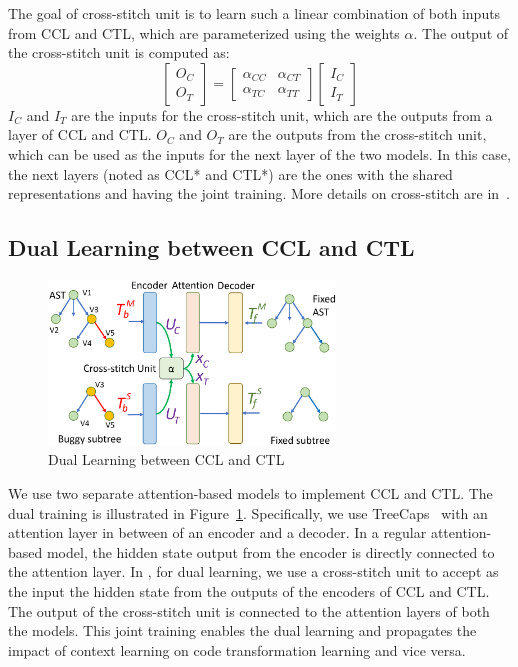 The goal of cross-stitch unit is to learn such a linear combination of
both inputs from CCL and CTL, which are parameterized
using the weights $\alpha$. The output of the cross-stitch unit is
computed as:
\begin{equation}\label{eq:cross-stitch}
	\begin{bmatrix}
		O_C\\
		O_T
	\end{bmatrix}
	=
	\begin{bmatrix}
		\alpha_{CC} &  \alpha_{CT} \\
		\alpha_{TC} &  \alpha_{TT}
	\end{bmatrix}
	\begin{bmatrix}
		I_C\\
		I_T
	\end{bmatrix}
\end{equation}
$I_C$ and $I_T$ are the inputs for the cross-stitch unit, which are
the outputs from a layer of CCL and CTL. $O_C$ and $O_T$ are the
outputs from the cross-stitch unit, which can be used as the inputs
for the next layer of the two models. In this case, the next layers
(noted as CCL* and CTL*) are the ones with the shared representations
and having the joint training. More details on cross-stitch are
in~\cite{misra2016cross}.

\subsection{Dual Learning between CCL and CTL}

\begin{figure}[t]
	\centering
	\includegraphics[width=3in]{graphs/dual-learning-repair.png}
	\caption{Dual Learning between CCL and CTL}
	\label{fig:dual-learning}
\end{figure}

We use two separate attention-based  models to implement
CCL and CTL. The dual training is illustrated in
Figure~\ref{fig:dual-learning}. Specifically, we use
TreeCaps~\cite{bui2021treecaps} with an attention layer in between of
an encoder and a decoder. In a regular attention-based 
model, the hidden state output from the encoder is directly connected
to the attention layer. In {\tool}, for dual learning, we use a
cross-stitch unit to accept as the input the hidden state from the
outputs of the encoders of CCL and CTL. The output of the cross-stitch
unit is connected to the attention layers of both the models. This
joint training enables the dual learning and propagates the impact of
context learning on code transformation learning and vice versa.


